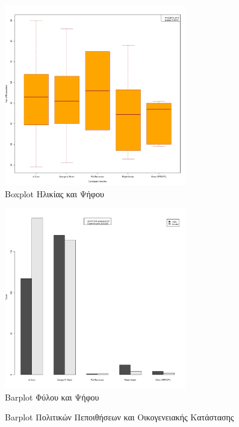 \documentclass[10pt, letterpaper]{article}
\begin{document}
\begin{center}
\begin{figure}[h]
            \end{figure}
            \newpage
            \begin{figure}[h]
                \caption{Boxplot Ηλικίας και Ψήφου}
                \label{agevoteplot}
                \centering
                \includegraphics[width=300px, keepaspectratio]{resources/Age_Vote_Plot.png}
            \end{figure}
            \newpage
            \begin{figure}[h]
                \caption{Barplot Φύλου και Ψήφου}
                \label{gendervoteplot}
                \centering
                \includegraphics[width=300px, keepaspectratio]{resources/Gender_Vote_Plot.png}
            \end{figure}
            \newpage
            \begin{figure}[h]
                \caption{Barplot Πολιτικών Πεποιθήσεων και Οικογενειακής Κατάστασης}
                \label{politicalmaritalplot}
                \centering

\end{figure}
\end{center}
\end{document}
